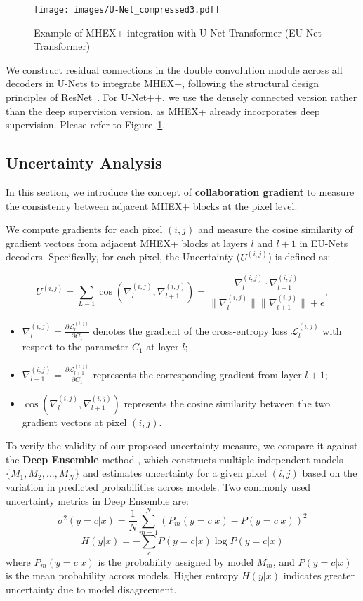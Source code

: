 \documentclass[runningheads]{llncs}
\begin{document}
\begin{figure}
    \centering
    \texttt{[image: images/U-Net\_compressed3.pdf]}
    \caption{Example of MHEX+ integration with U-Net Transformer (EU-Net Transformer)}
    \label{fig:EUNT}
\end{figure}

We construct residual connections in the double convolution module across all decoders in U-Nets to integrate MHEX+, following the structural design principles of ResNet~\cite{he2015deepresiduallearningimage}. For U-Net++, we use the densely connected version rather than the deep supervision version, as MHEX+ already incorporates deep supervision. Please refer to Figure~\ref{fig:EUNT}.

\subsection{Uncertainty Analysis}
\label{sec:CollabGrad}

In this section, we introduce the concept of \textbf{collaboration gradient} to measure the consistency between adjacent MHEX+ blocks at the pixel level. 

We compute gradients for each pixel \((i, j)\) and measure the cosine similarity of gradient vectors from adjacent MHEX+ blocks at layers \(l\) and \(l+1\) in EU-Nets decoders. Specifically, for each pixel, the Uncertainty (\(U^{(i,j)}\)) is defined as:

\[
U^{(i,j)} = \sum_{L-1} \cos(\nabla_{l}^{(i,j)}, \nabla_{l+1}^{(i,j)}) 
= \frac{\nabla_{l}^{(i,j)} \cdot \nabla_{l+1}^{(i,j)}}{\|\nabla_{l}^{(i,j)}\| \|\nabla_{l+1}^{(i,j)}\| + \epsilon},
\]

\begin{itemize}
    \item \(\nabla_{l}^{(i,j)} = \frac{\partial \mathcal{L}_{l}^{(i,j)}}{\partial C_1}\) denotes the gradient of the cross-entropy loss \(\mathcal{L}_{l}^{(i,j)}\) with respect to the parameter \(C_1\) at layer \(l\);
    \item \(\nabla_{l+1}^{(i,j)} = \frac{\partial \mathcal{L}_{l+1}^{(i,j)}}{\partial C_1}\) represents the corresponding gradient from layer \(l+1\);
    \item \(\cos(\nabla_{l}^{(i,j)}, \nabla_{l+1}^{(i,j)})\) represents the cosine similarity between the two gradient vectors at pixel \((i,j)\).
\end{itemize}

To verify the validity of our proposed uncertainty measure, we compare it against the \textbf{Deep Ensemble} method \cite{lakshminarayanan2017simplescalablepredictiveuncertainty}, which constructs multiple independent models \(\{M_1, M_2, ..., M_N\}\) and estimates uncertainty for a given pixel \((i, j)\) based on the variation in predicted probabilities across models. Two commonly used uncertainty metrics in Deep Ensemble are:
\[
\sigma^2(y = c | x) = \frac{1}{N} \sum_{m=1}^{N} (P_m(y = c | x) - P(y = c | x))^2
\]
\[
H(y | x) = -\sum_{c} P(y = c | x) \log P(y = c | x)
\]
where \(P_m(y = c | x)\) is the probability assigned by model \(M_m\), and \(P(y = c | x)\) is the mean probability across models. Higher entropy \(H(y | x)\) indicates greater uncertainty due to model disagreement.
\end{document}
